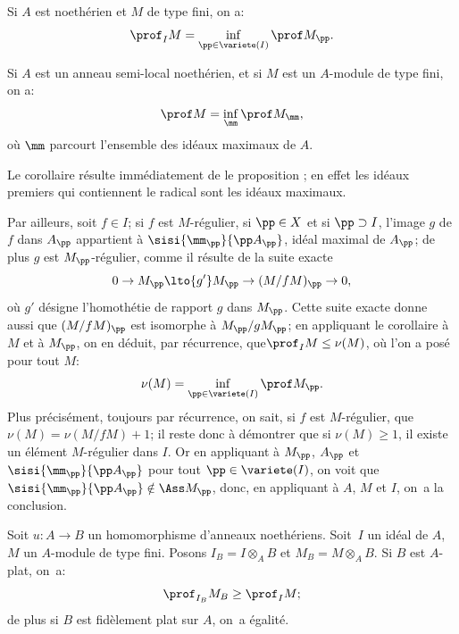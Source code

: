 \begin{proposition} \label{III.2.9}
Si $A$ est noeth\'erien et $M$ de type fini, on a:
\[
\prof_I M = \inf_{\pp \in \variete (I)} \prof M_\pp.
\]
\end{proposition}

\begin{corollaire} \label{III.2.10}
Si $A$ est un anneau semi-local noeth\'erien, et si $M$ est un $A$-module de type fini, on a:
\[
\prof M = \inf_\mm \prof M_\mm,
\]
o\`u $\mm $ parcourt l'ensemble des id\'eaux maximaux de $A$.
\end{corollaire}

Le corollaire r\'esulte imm\'ediatement de le proposition ; en effet les id\'eaux premiers qui contiennent le radical sont les id\'eaux maximaux.

Par ailleurs, soit $f\in I$; si $f$ est $M$-r\'egulier, si $\pp\in X$ et si $\pp\supset I$, l'image $g$ de $f$ dans $A_\pp$ appartient \`a $\sisi{\mm_\pp}{\pp A_\pp}$, id\'eal maximal de $A_\pp$; de plus $g$ est $M_\pp$-r\'egulier, comme il r\'esulte de la suite exacte
\begin{equation} \label{eq:III.2.3} 0 \to M_\pp \lto{g'} M_\pp \to (M/fM)_\pp \to 0,
\end{equation}
o\`u $g'$ d\'esigne l'homoth\'etie de rapport $g$ dans $M_\pp$. Cette suite exacte donne aussi que $(M/fM)_\pp$ est isomorphe \`a $M_\pp/gM_\pp$; en appliquant le corollaire  \`a $M$ et \`a $M_\pp$, on en d\'eduit, par r\'ecurrence, que\pageoriginale $\prof_I M\leq \nu(M)$, o\`u l'on a pos\'e pour tout $M$:
\[
\nu(M)=\inf_{\pp\in\variete(I)} \prof M_\pp.
\]
Plus pr\'ecis\'ement, toujours par r\'ecurrence, on sait, si $f$ est $M$-r\'egulier, que $\nu(M)= \nu(M/fM)+1$; il reste donc \`a d\'emontrer que si $\nu(M)\geq 1$, il existe un \'el\'ement $M$-r\'egulier dans $I$. Or en appliquant  \`a $M_\pp$, $A_\pp$ et $\sisi{\mm_\pp}{\pp A_\pp}$ pour tout $\pp\in \variete(I)$, on voit que $\sisi{\mm_\pp}{\pp A_\pp} \notin \Ass M_\pp$, donc, en appliquant  \`a $A$, $M$ et $I$, on~a la conclusion.

\enlargethispage{\baselineskip}%
\begin{proposition} \label{III.2.11}
Soit $u:A\to B$ un homomorphisme d'anneaux noeth\'eriens. Soit~$I$ un id\'eal de $A$, $M$ un $A$-module de type fini. Posons $I_B=I\otimes_A B$ et $M_B=M\otimes_A B$. Si $B$ est $A$-plat, on~a:
\[
\prof_{I_B} M_B \geq \prof_I M;
\]
de plus si $B$ est fid\`element plat sur $A$, on~a \'egalit\'e.
\end{proposition}


